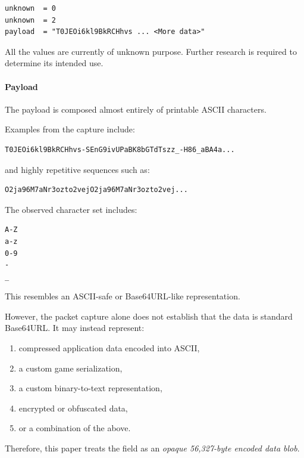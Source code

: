 \begin{lstlisting}
unknown  = 0
unknown  = 2
payload  = "T0JEOi6kl9BkRCHhvs ... <More data>"
\end{lstlisting}

\begin{tcolorbox}[colback=yellow!10,colframe=orange!80!black,title=Warning]
All the values are currently of unknown purpose.
Further research is required to determine its intended use.
\end{tcolorbox}

\newpage

\paragraph{Payload}

The payload is composed almost entirely of printable ASCII
characters.

Examples from the capture include:

\begin{lstlisting}
T0JEOi6kl9BkRCHhvs-SEnG9ivUPaBK8bGTdTszz_-H86_aBA4a...
\end{lstlisting}

and highly repetitive sequences such as:

\begin{lstlisting}
O2ja96M7aNr3ozto2vejO2ja96M7aNr3ozto2vej...
\end{lstlisting}

The observed character set includes:

\begin{lstlisting}
A-Z
a-z
0-9
-
_
\end{lstlisting}

This resembles an ASCII-safe or Base64URL-like representation.

However, the packet capture alone does not establish that the data is
standard Base64URL\@.  It may instead represent:

\begin{enumerate}[nosep]
    \item compressed application data encoded into ASCII,
    \item a custom game serialization,
    \item a custom binary-to-text representation,
    \item encrypted or obfuscated data,
    \item or a combination of the above.
\end{enumerate}

Therefore, this paper treats the field as an
\emph{opaque 56,327-byte encoded data blob}.

\newpage